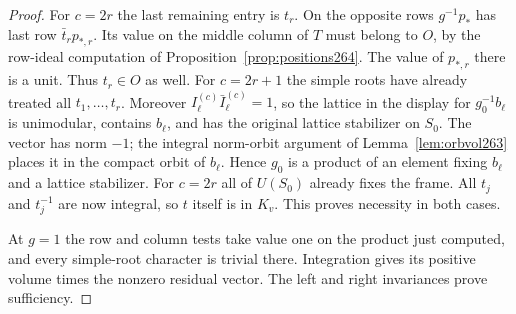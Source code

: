 \documentclass[a4paper,11pt]{article}
\theoremstyle{definition}
\theoremstyle{remark}
\numberwithin{equation}{section}
\begin{document}
\begin{proof}
For \(c=2r\) the last remaining entry is \(t_r\).
On the opposite rows \(g^{-1}p_*\) has last row
\(\bar t_r p_{*,r}\). Its value on the middle column of \(T\)
must belong to \(O\), by the row-ideal computation of
Proposition~\ref{prop:positions264}. The value of \(p_{*,r}\)
there is a unit. Thus \(t_r\in O\) as well.
For \(c=2r+1\) the simple roots have already treated all
\(t_1,\ldots,t_r\). Moreover \(I_\ell^{(c)}\bar I_\ell^{(c)}=1\),
so the lattice in the display for \(g_0^{-1}b_\ell\) is
unimodular, contains \(b_\ell\), and has the original lattice
stabilizer on \(S_0\). The vector has norm \(-1\); the integral
norm-orbit argument of Lemma~\ref{lem:orbvol263} places it
in the compact orbit of \(b_\ell\). Hence \(g_0\) is a product
of an element fixing \(b_\ell\) and a lattice stabilizer.
For \(c=2r\) all of \(U(S_0)\) already fixes the frame.
All \(t_j\) and \(t_j^{-1}\) are now integral, so \(t\) itself
is in \(K_v\). This proves necessity in both cases.

At \(g=1\) the row and column tests take value one on the
product just computed, and every simple-root character is
trivial there. Integration gives its positive volume times
the nonzero residual vector. The left and right invariances
prove sufficiency.
\end{proof}
\end{document}
